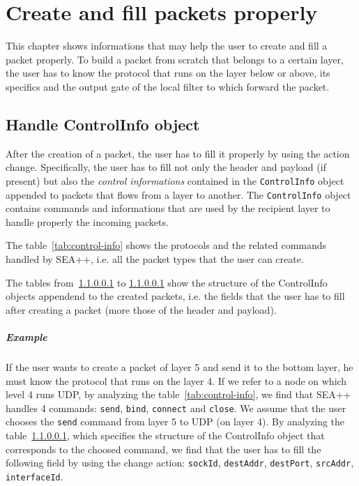 

\chapter{Create and fill packets properly}
\label{ch:appendix-A}

This chapter shows informations that may help the user to create and fill a packet properly. To build a packet from scratch that belongs to a certain layer, the user has to know the protocol that runs on the layer below or above, its specifics and the output gate of the local filter to which forward the packet.

\section{Handle ControlInfo object}


After the creation of a packet, the user has to fill it properly by using the action change. Specifically, the user has to fill not only the header and payload (if present) but also the \emph{control informations} contained in the \texttt{ControlInfo} object appended to packets that flows from a layer to another. The \texttt{ControlInfo} object contains commands and informations that are used by the recipient layer to handle properly the incoming packets.

The table~\ref{tab:control-info} shows the protocols and the related commands handled by SEA++, i.e. all the packet types that the user can create. 

The tables from~\ref{} to \ref{} show the structure of the ControlInfo objects appendend to the created packets, i.e. the fields that the user has to fill after creating a packet (more those of the header and payload).

\paragraph{Example}
If the user wants to create a packet of layer 5 and send it to the bottom layer, he must know the protocol that runs on the layer 4. If we refer to a node on which level 4 runs UDP, by analyzing the table~\ref{tab:control-info}, we find that SEA++ handles 4 commands: \texttt{send}, \texttt{bind}, \texttt{connect} and \texttt{close}. We assume that the user chooses the \texttt{send} command from layer 5 to UDP (on layer 4). By analyzing the table~\ref{}, which specifies the structure of the ControlInfo object that corresponds to the choosed command, we find that the user has to fill the following field by using the change action: \texttt{sockId}, \texttt{destAddr}, \texttt{destPort}, \texttt{srcAddr}, \texttt{interfaceId}.

